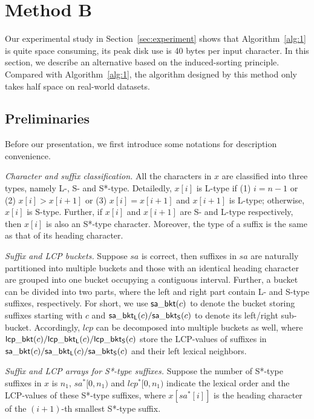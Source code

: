 \documentclass[10pt,journal,compsoc]{IEEEtran}
\begin{document}
	

\section{Method B} \label{sec:method2}

Our experimental study in Section~\ref{sec:experiment} shows that Algorithm~\ref{alg:1} is quite space consuming, its peak disk use is 40 bytes per input character. In this section, we describe an alternative based on the induced-sorting principle. Compared with Algorithm~\ref{alg:1}, the algorithm designed by this method only takes half space on real-world datasets.

\subsection{Preliminaries} \label{sec:method2:preliminaries}

Before our presentation, we first introduce some notations for description convenience.

{\em Character and suffix classification.} All the characters in $x$ are classified into three types, namely L-, S- and S*-type. Detailedly, $x[i]$ is L-type if (1) $i = n - 1$ or (2) $x[i] > x[i + 1]$ or (3) $x[i] = x[i + 1]$ and $x[i + 1]$ is L-type; otherwise, $x[i]$ is S-type. Further, if $x[i]$ and $x[i + 1]$ are S- and L-type respectively, then $x[i]$ is also an S*-type character. Moreover, the type of a suffix is the same as that of its heading character.

{\em Suffix and LCP buckets.} Suppose $sa$ is correct, then suffixes in $sa$ are naturally partitioned into multiple buckets and those with an identical heading character are grouped into one bucket occupying a contiguous interval. Further, a bucket can be divided into two parts, where the left and right part contain L- and S-type suffixes, respectively. For short, we use ${\sf sa\_bkt}(c)$ to denote the bucket storing suffixes starting with $c$ and ${\sf sa\_bkt_L}(c)/{\sf sa\_bkt_S}(c)$ to denote its left/right sub-bucket. Accordingly, $lcp$ can be decomposed into multiple buckets as well, where ${\sf lcp\_bkt}(c)/{\sf lcp\_bkt_L}(c)/{\sf lcp\_bkt_S}(c)$ store the LCP-values of suffixes in ${\sf sa\_bkt}(c)/{\sf sa\_bkt_L}(c)/{\sf sa\_bkt_S}(c)$ and their left lexical neighbors.

{\em Suffix and LCP arrays for S*-type suffixes.} Suppose the number of S*-type suffixes in $x$ is $n_1$, $sa^*[0, n_1)$ and $lcp^*[0, n_1)$ indicate the lexical order and the LCP-values of these S*-type suffixes, where $x[sa^*[i]]$ is the heading character of the $(i + 1)$-th smallest S*-type suffix.
\end{document}
